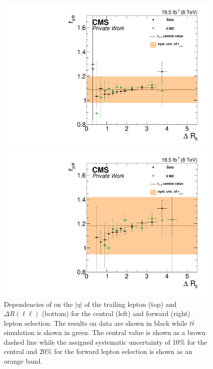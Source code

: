 \begin{figure}[htbp]
\begin{minipage}[t]{0.49\textwidth}
  \includegraphics[width=\textwidth]{plots/BG/rmue/rMuE_ZPeakControlCentral_Full2012_DeltaR_None.pdf}
\end{minipage}
\begin{minipage}[t]{0.49\textwidth}
\includegraphics[width=\textwidth]{plots/BG/rmue/rMuE_ZPeakControlForward_Full2012_DeltaR_None.pdf}
\end{minipage}
\caption{Dependencies of \rmue on the $|\eta|$ of the trailing lepton (top) and  $\Delta R(\ell\ell)$ (bottom) for the central (left) and forward (right) lepton selection. The results on data are shown in black while $t\bar{t}$ simulation is shown in green. The central value is shown as a brown dashed line while the assigned systematic uncertainty of 10\% for the central and 20\% for the forward lepton selection is shown as an orange band.}
\label{fig:rmueDependenciesApp2}
\end{figure} 


